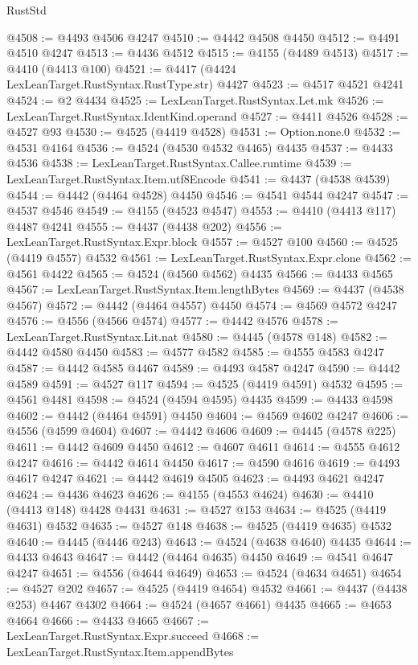 \begin{lexlean}{RustStd}
\begin{coremodule}
@4508 := @4493 @4506 @4247
@4510 := @4442 @4508 @4450
@4512 := @4491 @4510 @4247
@4513 := @4436 @4512
@4515 := @4155 (@4489 @4513)
@4517 := @4410 (@4413 @100)
@4521 := @4417 (@4424 LexLeanTarget.RustSyntax.RustType.str) @4427
@4523 := @4517 @4521 @4241
@4524 := @2 @4434
@4525 := LexLeanTarget.RustSyntax.Let.mk
@4526 := LexLeanTarget.RustSyntax.IdentKind.operand
@4527 := @4411 @4526
@4528 := @4527 @93
@4530 := @4525 (@4419 @4528)
@4531 := Option.none.{0}
@4532 := @4531 @4164
@4536 := @4524 (@4530 @4532 @4465) @4435
@4537 := @4433 @4536
@4538 := LexLeanTarget.RustSyntax.Callee.runtime
@4539 := LexLeanTarget.RustSyntax.Item.utf8Encode
@4541 := @4437 (@4538 @4539)
@4544 := @4442 (@4464 @4528) @4450
@4546 := @4541 @4544 @4247
@4547 := @4537 @4546
@4549 := @4155 (@4523 @4547)
@4553 := @4410 (@4413 @117) @4487 @4241
@4555 := @4437 (@4438 @202)
@4556 := LexLeanTarget.RustSyntax.Expr.block
@4557 := @4527 @100
@4560 := @4525 (@4419 @4557) @4532
@4561 := LexLeanTarget.RustSyntax.Expr.clone
@4562 := @4561 @4422
@4565 := @4524 (@4560 @4562) @4435
@4566 := @4433 @4565
@4567 := LexLeanTarget.RustSyntax.Item.lengthBytes
@4569 := @4437 (@4538 @4567)
@4572 := @4442 (@4464 @4557) @4450
@4574 := @4569 @4572 @4247
@4576 := @4556 (@4566 @4574)
@4577 := @4442 @4576
@4578 := LexLeanTarget.RustSyntax.Lit.nat
@4580 := @4445 (@4578 @148)
@4582 := @4442 @4580 @4450
@4583 := @4577 @4582
@4585 := @4555 @4583 @4247
@4587 := @4442 @4585 @4467
@4589 := @4493 @4587 @4247
@4590 := @4442 @4589
@4591 := @4527 @117
@4594 := @4525 (@4419 @4591) @4532
@4595 := @4561 @4481
@4598 := @4524 (@4594 @4595) @4435
@4599 := @4433 @4598
@4602 := @4442 (@4464 @4591) @4450
@4604 := @4569 @4602 @4247
@4606 := @4556 (@4599 @4604)
@4607 := @4442 @4606
@4609 := @4445 (@4578 @225)
@4611 := @4442 @4609 @4450
@4612 := @4607 @4611
@4614 := @4555 @4612 @4247
@4616 := @4442 @4614 @4450
@4617 := @4590 @4616
@4619 := @4493 @4617 @4247
@4621 := @4442 @4619 @4505
@4623 := @4493 @4621 @4247
@4624 := @4436 @4623
@4626 := @4155 (@4553 @4624)
@4630 := @4410 (@4413 @148) @4428 @4431
@4631 := @4527 @153
@4634 := @4525 (@4419 @4631) @4532
@4635 := @4527 @148
@4638 := @4525 (@4419 @4635) @4532
@4640 := @4445 (@4446 @243)
@4643 := @4524 (@4638 @4640) @4435
@4644 := @4433 @4643
@4647 := @4442 (@4464 @4635) @4450
@4649 := @4541 @4647 @4247
@4651 := @4556 (@4644 @4649)
@4653 := @4524 (@4634 @4651)
@4654 := @4527 @202
@4657 := @4525 (@4419 @4654) @4532
@4661 := @4437 (@4438 @253) @4467 @4302
@4664 := @4524 (@4657 @4661) @4435
@4665 := @4653 @4664
@4666 := @4433 @4665
@4667 := LexLeanTarget.RustSyntax.Expr.succeed
@4668 := LexLeanTarget.RustSyntax.Item.appendBytes

\end{coremodule}
\end{lexlean}
